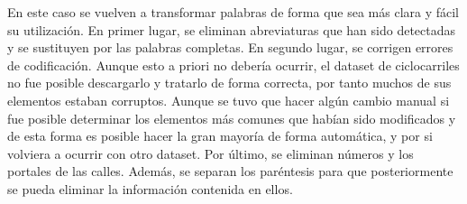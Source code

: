 En este caso se vuelven a transformar palabras de forma que sea más clara y fácil su utilización.
En primer lugar, se eliminan abreviaturas que han sido detectadas y se sustituyen por las palabras completas.
\newline
En segundo lugar, se corrigen errores de codificación. Aunque esto a priori no debería ocurrir, el dataset de ciclocarriles no fue posible descargarlo y tratarlo de forma correcta, por tanto muchos de sus elementos estaban corruptos. Aunque se tuvo que hacer algún cambio manual si fue posible determinar los elementos más comunes que habían sido modificados y de esta forma es posible hacer la gran mayoría de forma automática, y por si volviera a ocurrir con otro dataset.
\newline
Por último, se eliminan números y los portales de las calles. Además, se separan los paréntesis para que posteriormente se pueda eliminar la información contenida en ellos.














